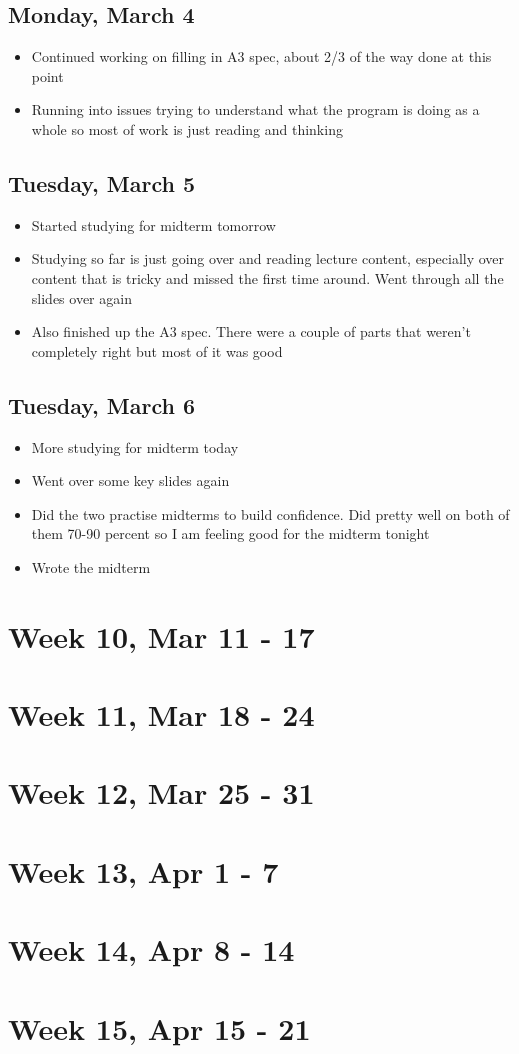 \documentclass{article}
\begin{document}
\subsection{Monday, March 4}
\begin{itemize}
    \item Continued working on filling in A3 spec, about 2/3 of the way done at this point
    \item Running into issues trying to understand what the program is doing as a whole so most of work is just reading and thinking
\end{itemize}

\subsection{Tuesday, March 5}
\begin{itemize}
    \item Started studying for midterm tomorrow
    \item Studying so far is just going over and reading lecture content, especially over content that is tricky and missed the first time around. Went through all the slides over again
    \item Also finished up the A3 spec. There were a couple of parts that weren't completely right but most of it was good
\end{itemize}

\subsection{Tuesday, March 6}
\begin{itemize}
    \item More studying for midterm today
    \item Went over some key slides again
    \item Did the two practise midterms to build confidence. Did pretty well on both of them 70-90 percent so I am feeling good for the midterm tonight
    \item Wrote the midterm
\end{itemize}

\section{Week 10, Mar 11 - 17}

\section{Week 11, Mar 18 - 24}

\section{Week 12, Mar 25 - 31}

\section{Week 13, Apr 1 - 7}

\section{Week 14, Apr 8 - 14}

\section{Week 15, Apr 15 - 21}
\end{document}
